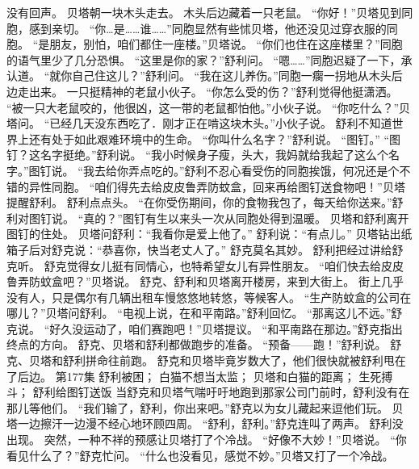 \documentclass[a4paper,12pt,UTF8,twoside]{ctexbook}
\begin{document}
        没有回声。 
        贝塔朝一块木头走去。 
        木头后边藏着一只老鼠。 
        “你好！”贝塔见到同胞，感到亲切。 
        “你…是……谁……”同胞显然有些怵贝塔，他还没见过穿衣服的同胞。 
        “是朋友，别怕，咱们都住一座楼。”贝塔说。 
        “你们也住在这座楼里？”同胞的语气里少了几分恐惧。 
        “这里是你的家？”舒利问。 
        “嗯……”同胞迟疑了一下，承认道。 
        “就你自己住这儿？”舒利问。 
        “我在这儿养伤。”同胞一瘸一拐地从木头后边走出来。 
        一只挺精神的老鼠小伙子。 
        “你怎么受的伤？”舒利觉得他挺潇洒。 
        “被一只大老鼠咬的，他很凶，这一带的老鼠都怕他。”小伙子说。 
        “你吃什么？”贝塔问。 
        “已经几天没东西吃了．刚才正在啃这块木头。”小伙子说。 
        舒利不知道世界上还有处于如此艰难环境中的生命。 
        “你叫什么名字？”舒利说。 
        “图钉。” 
        “图钉？这名字挺绝。”舒利说。 
        “我小时候身子瘦，头大，我妈就给我起了这么个名字。”图钉说。 
        “我去给你弄点吃的。”舒利不忍心看受伤的同胞挨饿，何况还是个不错的异性同胞。 
        “咱们得先去给皮皮鲁弄防蚊盒，回来再给图钉送食物吧！”贝塔提醒舒利。 
        舒利点点头。 
        “在你受伤期间，你的食物我包了，每天给你送来。”舒利对图钉说。 
        “真的？”图钉有生以来头一次从同胞处得到温暖。 
        贝塔和舒利离开图钉的住处。 
        贝塔问舒利：“我看你是爱上他了。” 
        舒利说：“有点儿。” 
        贝塔钻出纸箱子后对舒克说：“恭喜你，快当老丈人了。” 
        舒克莫名其妙。 
        舒利把经过讲给舒克听。 
        舒克觉得女儿挺有同情心，也特希望女儿有异性朋友。 
        “咱们快去给皮皮鲁弄防蚊盒吧？”贝塔说。 
        舒克、舒利和贝塔离开楼房，来到大街上。 
        街上几乎没有人，只是偶尔有几辆出租车慢悠悠地转悠，等候客人。 
        “生产防蚊盒的公司在哪儿？”贝塔问舒利。 
        “电视上说，在和平南路。”舒利回忆。 
        “那离这儿不远。”舒克说。 
        “好久没运动了，咱们赛跑吧！”贝塔提议。 
        “和平南路在那边。”舒克指出终点的方向。 
        舒克、贝塔和舒利都做跑步的准备。 
        “预备——跑！”舒利说。 
        舒克、贝塔和舒利拼命往前跑。 
        舒克和贝塔毕竟岁数大了，他们很快就被舒利甩在了后边。   第177集 
        舒利被困； 
        白猫不想当太监； 
        贝塔和白猫的距离； 
        生死搏斗； 
        舒利给图钉送饭   
        当舒克和贝塔气喘吁吁地跑到那家公司门前时，舒利没有在那儿等他们。 
        “我们输了，舒利，你出来吧。”舒克以为女儿藏起来逗他们玩。 
        贝塔一边擦汗一边漫不经心地环顾四周。 
        “舒利，舒利。”舒克连叫了两声。 
        舒利没出现。 
        突然，一种不祥的预感让贝塔打了个冷战。 
        “好像不大妙！”贝塔说。 
        “你看见什么了？”舒克忙问。 
        “什么也没看见，感觉不妙。”贝塔又打了一个冷战。 
\end{document}
